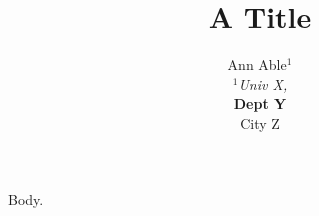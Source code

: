 \documentclass{article}
\begin{document}
\title{A Title}
\author{\begin{tabular}{c}Ann Able$^1$\\ $^1$\it Univ X,\\ \bf Dept Y\\ City Z\end{tabular}}
\maketitle
Body.
\end{document}
